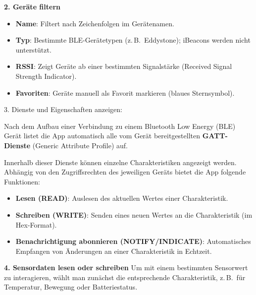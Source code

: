 \vspace{1\baselineskip}

\textbf{2. Geräte filtern}
\begin{itemize}
    \item \textbf{Name}: Filtert nach Zeichenfolgen im Gerätenamen.
    
    \item \textbf{Typ}: Bestimmte BLE-Gerätetypen (z.\,B.\ Eddystone); iBeacons werden nicht unterstützt.
    
    \item \textbf{RSSI}: Zeigt Geräte ab einer bestimmten Signalstärke (Received Signal Strength Indicator).
    
    \item \textbf{Favoriten}: Geräte manuell als Favorit markieren (blaues Sternsymbol).
\end{itemize}
\cite{Nordic:2018:Apple}

\vspace{1\baselineskip}

3. Dienste und Eigenschaften anzeigen:\
    
Nach dem Aufbau einer Verbindung zu einem Bluetooth Low Energy (BLE) Gerät listet die App automatisch alle vom Gerät bereitgestellten \textbf{GATT-Dienste} (Generic Attribute Profile) auf.
\cite{Nordic:2018:Apple}

\vspace{1\baselineskip}

Innerhalb dieser Dienste können einzelne Charakteristiken angezeigt werden. Abhängig von den Zugriffsrechten des jeweiligen Geräts bietet die App folgende Funktionen:
\cite{Nordic:2018:Apple}

\begin{itemize}
    \item \textbf{Lesen (READ)}: Auslesen des aktuellen Wertes einer Charakteristik.
    
    \item \textbf{Schreiben (WRITE)}: Senden eines neuen Wertes an die Charakteristik (im Hex-Format).
    
    \item \textbf{Benachrichtigung abonnieren (NOTIFY/INDICATE)}: Automatisches Empfangen von Änderungen an einer Charakteristik in Echtzeit.
\end{itemize}

\vspace{1\baselineskip}

\textbf{4. Sensordaten lesen oder schreiben}  
Um mit einem bestimmten Sensorwert zu interagieren, wählt man zunächst die entsprechende Charakteristik, z.\,B.\ für Temperatur, Bewegung oder Batteriestatus.
\cite{Nordic:2018:Apple}

